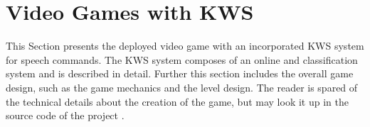 
\chapter{Video Games with KWS}\label{sec:game}
This Section presents the deployed video game with an incorporated KWS system for speech commands.
The KWS system composes of an online and classification system and is described in detail.
Further this section includes the overall game design, such as the game mechanics and the level design.
The reader is spared of the technical details about the creation of the game, but may look it up in the source code of the project \cite{KWSGame}.



